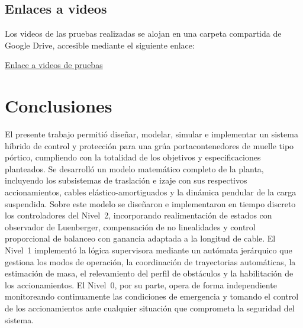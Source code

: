 \documentclass[12pt, a4paper]{article}
\begin{document}
\subsection{Enlaces a videos}
\label{sec:videos}

Los videos de las pruebas realizadas se alojan en una carpeta compartida de Google
Drive, accesible mediante el siguiente enlace:

\begin{center}
    \href{https://drive.google.com/drive/folders/1PMs6fmgEDI3PnUhHaOELgL_wx4F5qJRc?usp=sharing}{Enlace a videos de pruebas}
\end{center}

\newpage
\section{Conclusiones}

El presente trabajo permitió diseñar, modelar, simular e implementar un sistema
híbrido de control y protección para una grúa portacontenedores de muelle tipo
pórtico, cumpliendo con la totalidad de los objetivos y especificaciones planteados.
Se desarrolló un modelo matemático completo de la planta, incluyendo los subsistemas
de traslación e izaje con sus respectivos accionamientos, cables elástico-amortiguados
y la dinámica pendular de la carga suspendida. Sobre este modelo se diseñaron e
implementaron en tiempo discreto los controladores del Nivel~2, incorporando
realimentación de estados con observador de Luenberger, compensación de no
linealidades y control proporcional de balanceo con ganancia adaptada a la longitud
de cable. El Nivel~1 implementó la lógica supervisora mediante un autómata jerárquico
que gestiona los modos de operación, la coordinación de trayectorias automáticas, la
estimación de masa, el relevamiento del perfil de obstáculos y la habilitación de los
accionamientos. El Nivel~0, por su parte, opera de forma independiente monitoreando
continuamente las condiciones de emergencia y tomando el control de los accionamientos
ante cualquier situación que comprometa la seguridad del sistema.
\end{document}
